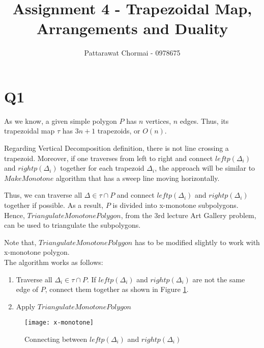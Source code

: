 \documentclass[12pt]{article}
\begin{document}
\title{Assignment 4 - Trapezoidal Map, Arrangements and Duality }
\author{
	Pattarawat Chormai - 0978675 \\
}
\maketitle

\section*{Q1}

As we know, a given simple polygon $P$ has $n$ vertices, $n$ edges. Thus, its trapezoidal
map $\tau$ has $3n+1$ trapezoids, or $O(n)$.

Regarding Vertical Decomposition definition, there is not line crossing a
trapezoid. Moreover, if one traverses from left to right and connect $leftp(\Delta_i)$
and $rightp(\Delta_i)$ together for each trapezoid $\Delta_i$, the approach will be similar
to $MakeMonotone$ algorithm that has a sweep line moving horizontally.


Thus, we can traverse all $\Delta \in \tau \cap P$ and connect $leftp(\Delta_i)$ and
$rightp(\Delta_i)$ together if possible. As a result, $P$ is divided into x-monotone
subpolygons. Hence, $TriangulateMonotonePolygon$, from the 3rd lecture Art Gallery problem,
can be used to triangulate the subpolygons.


Note that, $TriangulateMonotonePolygon$ has to
be modified slightly to work with x-monotone polygon. \\


The algorithm works as follows:

\begin{enumerate}
    \item Traverse all $\Delta_i \in \tau \cap P$. If $leftp(\Delta_i)$
    and $rightp(\Delta_i)$ are not the same edge of $P$, connect them together
    as shown in Figure \ref{fig:x-monotone}.
    \item Apply $TriangulateMonotonePolygon$
\end{enumerate}

\begin{center}
    \label{figure1}
    \begin{figure}[h]
    \centering
    \texttt{[image: x-monotone]}\\
    \caption{Connecting between $leftp(\Delta_i)$ and $rightp(\Delta_i)$ } \label{fig:x-monotone}
    \end{figure}
\end{center}
\end{document}
